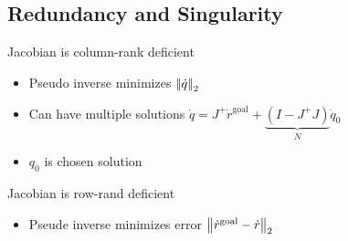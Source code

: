 \subsection{Redundancy and Singularity}
\begin{itemize}
     Jacobian is column-rank deficient
        \begin{itemize}
            \item Pseudo inverse minimizes $\left| \!\:\! \left| \dot q \right| \!\:\! \right|_2$
            \item Can have multiple solutions $\dot q = J^+ \dot r^\text{goal} + \underbrace{(I - J^+ J)}_{N} \dot q_0$
            \item $q_0$ is chosen solution
        \end{itemize}
     Jacobian is row-rand deficient
        \begin{itemize}
            \item Pseude inverse minimizes error $\left| \!\:\! \left| \dot r^\text{goal} - \dot r \right| \!\:\! \right|_2$
        \end{itemize}
\end{itemize}

